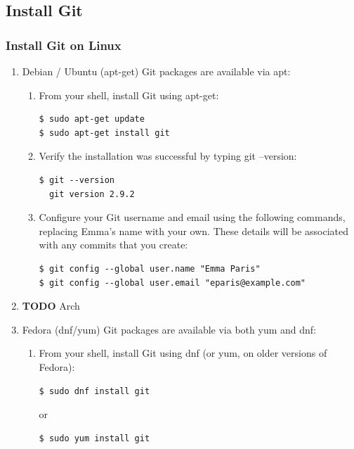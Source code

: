 \documentclass[11pt]{article}
\begin{document}
\subsection{Install Git}
\label{sec:org104832f}
\subsubsection{Install Git on Linux}
\label{sec:orge85d1fb}
\begin{enumerate}
\item Debian / Ubuntu (apt-get)
\label{sec:orgfd7318d}
Git packages are available via apt:

\begin{enumerate}
\item From your shell, install Git using apt-get:
\begin{verbatim}
$ sudo apt-get update
$ sudo apt-get install git
\end{verbatim}

\item Verify the installation was successful by typing git --version:
\begin{verbatim}
$ git --version
  git version 2.9.2
\end{verbatim}

\item Configure your Git username and email using the following commands, replacing Emma's name with your own. These details will be associated with any commits that you create:
\begin{verbatim}
$ git config --global user.name "Emma Paris"
$ git config --global user.email "eparis@example.com"
\end{verbatim}
\end{enumerate}

\item {\bfseries\sffamily TODO} Arch
\label{sec:org7f9930e}
\item Fedora (dnf/yum)
\label{sec:org161445e}
Git packages are available via both yum and dnf:

\begin{enumerate}
\item From your shell, install Git using dnf (or yum, on older versions of Fedora):
\begin{verbatim}
$ sudo dnf install git
\end{verbatim}

or

\begin{verbatim}
$ sudo yum install git
\end{verbatim}


\end{enumerate}
\end{enumerate}
\end{document}
